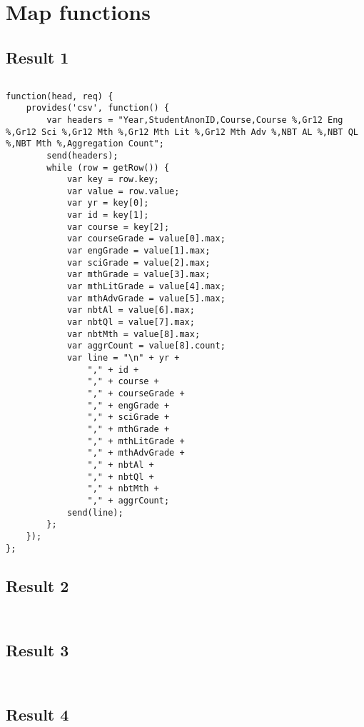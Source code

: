 \section{Map functions}
\subsection{Result 1}
\label{result-1-map}
\begin{verbatim}
\end{verbatim}
\label{result-1-list}
\begin{verbatim}
function(head, req) {
    provides('csv', function() {
        var headers = "Year,StudentAnonID,Course,Course %,Gr12 Eng %,Gr12 Sci %,Gr12 Mth %,Gr12 Mth Lit %,Gr12 Mth Adv %,NBT AL %,NBT QL %,NBT Mth %,Aggregation Count";
        send(headers);
        while (row = getRow()) {
            var key = row.key;
            var value = row.value;
            var yr = key[0];
            var id = key[1];
            var course = key[2];
            var courseGrade = value[0].max;
            var engGrade = value[1].max;
            var sciGrade = value[2].max;
            var mthGrade = value[3].max;
            var mthLitGrade = value[4].max;
            var mthAdvGrade = value[5].max;
            var nbtAl = value[6].max;
            var nbtQl = value[7].max;
            var nbtMth = value[8].max;
            var aggrCount = value[8].count;
            var line = "\n" + yr +
                "," + id +
                "," + course +
                "," + courseGrade +
                "," + engGrade +
                "," + sciGrade +
                "," + mthGrade +
                "," + mthLitGrade +
                "," + mthAdvGrade +
                "," + nbtAl +
                "," + nbtQl +
                "," + nbtMth +
                "," + aggrCount;
            send(line);
        };
    });
};
\end{verbatim}

\subsection{Result 2}
\label{result-2-map}
\begin{verbatim}
\end{verbatim}
\label{result-2-list}
\begin{verbatim}
\end{verbatim}

\subsection{Result 3}
\label{result-3-map}
\begin{verbatim}
\end{verbatim}
\label{result-3-list}
\begin{verbatim}
\end{verbatim}

\subsection{Result 4}
\label{result-4-map}
\begin{verbatim}
\end{verbatim}
\label{result-4-list}
\begin{verbatim}
\end{verbatim}
